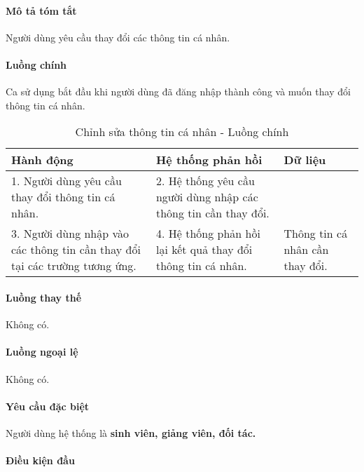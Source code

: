 \documentclass[./../main.tex]{subfiles}
\begin{document}
\paragraph*{Mô tả tóm tắt}

Người dùng yêu cầu thay đổi các thông tin cá nhân.

\paragraph*{Luồng chính} Ca sử dụng bắt đầu khi người dùng đã đăng nhập thành
công và muốn thay đổi thông tin cá nhân.

\begin{table}[H]
  \caption{Chỉnh sửa thông tin cá nhân - Luồng chính}
  \label{tab:update_info}
  \begin{tabularx}{\textwidth}{|X|X|X|}
  \hline
  \textbf{Hành động}                                                       & \textbf{Hệ thống phản hồi}                                   & \textbf{Dữ liệu}                \\ \hline
  1. Người dùng yêu cầu thay đổi thông tin cá nhân.                           & 2. Hệ thống yêu cầu người dùng nhập các thông tin cần thay đổi. &                                 \\ \hline
  3. Người dùng nhập vào các thông tin cần thay đổi tại các trường tương ứng. & 4. Hệ thống phản hồi lại kết quả thay đổi thông tin cá nhân.    & Thông tin cá nhân cần thay đổi. \\ \hline
  \end{tabularx}
\end{table}

\paragraph*{Luồng thay thế} Không có.

\paragraph*{Luồng ngoại lệ} Không có.

\paragraph*{Yêu cầu đặc biệt}

Người dùng hệ thống là \textbf{sinh viên, giảng viên, đối tác.}

\paragraph*{Điều kiện đầu}
\end{document}

